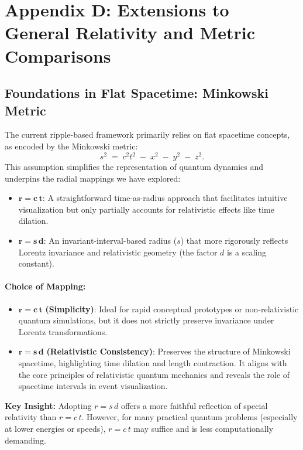 
\section{Appendix D: Extensions to General Relativity and Metric Comparisons}
\label{appendix:D}

\subsection{Foundations in Flat Spacetime: Minkowski Metric}
The current ripple-based framework primarily relies on flat spacetime concepts, as encoded by the Minkowski metric:
\[
s^2 \;=\; c^2 t^2 \;-\; x^2 \;-\; y^2 \;-\; z^2.
\]
This assumption simplifies the representation of quantum dynamics and underpins the radial mappings we have explored:
\begin{itemize}
    \item \(\boldsymbol{r = c\,t}\):
    A straightforward time-as-radius approach that facilitates intuitive visualization but only partially accounts for relativistic effects like time dilation.
    \item \(\boldsymbol{r = s\,d}\):
    An invariant-interval-based radius (\(s\)) that more rigorously reflects Lorentz invariance and relativistic geometry (the factor \(d\) is a scaling constant).
\end{itemize}

\paragraph{Choice of Mapping:}
\begin{itemize}
    \item \(\boldsymbol{r = c\,t}\) \textbf{(Simplicity)}:
    Ideal for rapid conceptual prototypes or non-relativistic quantum simulations, but it does not strictly preserve invariance under Lorentz transformations.
    \item \(\boldsymbol{r = s\,d}\) \textbf{(Relativistic Consistency)}:
    Preserves the structure of Minkowski spacetime, highlighting time dilation and length contraction. It aligns with the core principles of relativistic quantum mechanics and reveals the role of spacetime intervals in event visualization.
\end{itemize}

\noindent
\textbf{Key Insight:}  
Adopting \(r = s\,d\) offers a more faithful reflection of special relativity than \(r = c\,t\). However, for many practical quantum problems (especially at lower energies or speeds), \(r = c\,t\) may suffice and is less computationally demanding.

